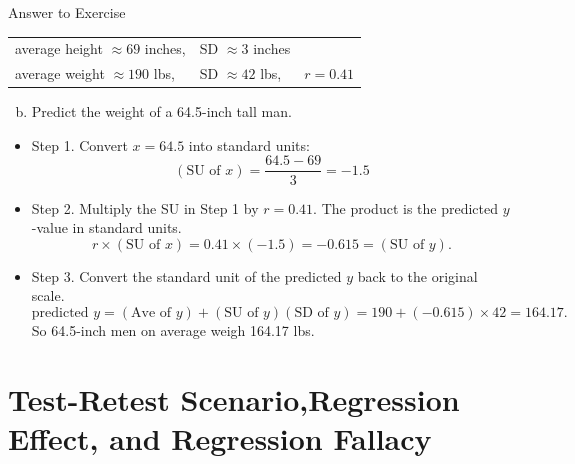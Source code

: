 \documentclass[
  ignorenonframetext,
]{beamer}
\providecommand{\tightlist}{%
  \setlength{\itemsep}{0pt}\setlength{\parskip}{0pt}}
\begin{document}
\begin{frame}{Answer to Exercise}
\protect\hypertarget{answer-to-exercise-1}{}
\begin{center}
\begin{tabular}{lll}
average height $\approx 69$ inches,  & SD $\approx 3$ inches \\
average weight $\approx 190$ lbs, & SD $\approx 42$ lbs, & $r= 0.41$\\
\end{tabular}
\end{center}

\vspace{-12pt}

\begin{enumerate}
[a.]
\setcounter{enumi}{1}
\tightlist
\item
  Predict the weight of a 64.5-inch tall man.
\end{enumerate}

\small

\begin{itemize}
\tightlist
\item
  Step 1. Convert \(x=64.5\) into standard units:
  \[(\text{SU of }x) =\dfrac{64.5-69}{3}=-1.5\]
\item
  Step 2. Multiply the SU in Step 1 by \(r=0.41\). The product is the
  predicted \(y\)-value in standard units.
  \[r\times (\text{SU of }x) =0.41\times(-1.5)=-0.615=(\text{SU of }y).\]
\item
  Step 3. Convert the standard unit of the predicted \(y\) back to the
  original scale.
  \[\text{predicted }y=(\text{Ave of }y)+ (\text{SU of }y)(\text{SD of }y)=190+(-0.615)\times 42=164.17.\]
  So 64.5-inch men on average weigh 164.17 lbs.
\end{itemize}
\end{frame}

\hypertarget{test-retest-scenarioregression-effect-and-regression-fallacy}{%
\section{\texorpdfstring{Test-Retest Scenario,\newline Regression
Effect, and \newline Regression
Fallacy}{Test-Retest Scenario,Regression Effect, and Regression Fallacy}}\label{test-retest-scenarioregression-effect-and-regression-fallacy}}
\end{document}
